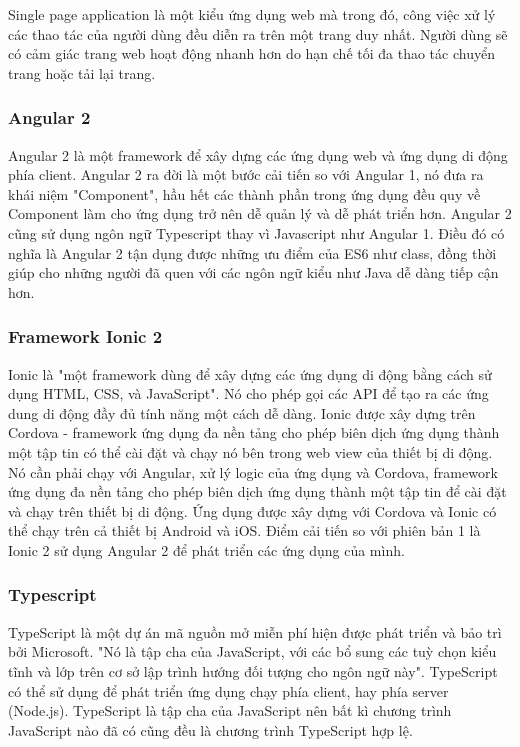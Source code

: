 \documentclass[a4paper,12pt,oneside]{article}
\begin{document}
\noindent Single page application là một kiểu ứng dụng web mà trong đó, công việc xử lý các thao tác của người dùng đều diễn ra trên một trang duy nhất. Người dùng sẽ có cảm giác trang web hoạt động nhanh hơn do hạn chế tối đa thao tác chuyển trang hoặc tải lại trang.

\subsubsection{Angular 2}
\noindent Angular 2 là một framework để xây dựng các ứng dụng web và ứng dụng di động phía client. Angular 2 ra đời là một bước cải tiến so với Angular 1, nó đưa ra khái niệm "Component", hầu hết các thành phần trong ứng dụng đều quy về Component làm cho ứng dụng trở nên dễ quản lý và dễ phát triển hơn. Angular 2 cũng sử dụng ngôn ngữ Typescript thay vì Javascript như Angular 1. Điều đó có nghĩa là Angular 2 tận dụng được những ưu điểm của ES6 như class, đồng thời giúp cho những người đã quen với các ngôn ngữ kiểu như Java dễ dàng tiếp cận hơn.

\subsubsection{Framework Ionic 2}
\noindent Ionic là "một framework dùng để xây dựng các ứng dụng di động bằng cách sử dụng HTML, CSS, và JavaScript"\cite{ionic}. Nó cho phép gọi các API để tạo ra các ứng dung di động đầy đủ tính năng một cách dễ dàng.
Ionic được xây dựng trên Cordova - framework ứng dụng đa nền tảng cho phép biên dịch ứng dụng thành một tập tin có thể cài đặt và chạy nó bên trong web view của thiết bị di động. Nó cần phải chạy với Angular, xử lý logic của ứng dụng và Cordova, framework ứng dụng đa nền tảng cho phép biên dịch ứng dụng thành một tập tin để cài đặt và chạy trên thiết bị di động. Ứng dụng được xây dựng với Cordova và Ionic có thể chạy trên cả thiết bị Android và iOS.
Điểm cải tiến so với phiên bản 1 là Ionic 2 sử dụng Angular 2 để phát triển các ứng dụng của mình.

\subsubsection{Typescript}
\noindent TypeScript là một dự án mã nguồn mở miễn phí hiện được phát triển và bảo trì bởi Microsoft. "Nó là tập cha của JavaScript, với các bổ sung các tuỳ chọn kiểu tĩnh và lớp trên cơ sở lập trình hướng đối tượng cho ngôn ngữ này"\cite{typescript}. TypeScript có thể sử dụng để phát triển ứng dụng chạy phía client, hay phía server (Node.js). TypeScript là tập cha của JavaScript nên bất kì chương trình JavaScript nào đã có cũng đều là chương trình TypeScript hợp lệ.
  
\end{document}
